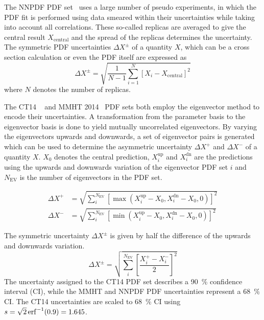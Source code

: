 The NNPDF PDF set~\cite{Ball:2014uwa} uses a large number of pseudo experiments,
in which the PDF fit is performed using data smeared within their uncertainties
while taking into account all correlations. These so-called replicas are
averaged to give the central result $X_\mathrm{central}$ and the spread of the
replicas determines the uncertainty. The symmetric PDF uncertainties $\Delta
X^\pm$ of a quantity $X$, which can be a cross section calculation or even the
PDF itself are expressed as
%
\begin{equation*}
    \Delta X^{\pm} = \sqrt{\frac{1}{N-1} \sum_{i=1}^N \left[ X_{i} - X_{\mathrm{central}} \right]^2}
\end{equation*}
%
where $N$ denotes the number of replicas.

The CT14 ~\cite{Dulat:2015mca} and MMHT 2014~\cite{Harland-Lang:2014zoa} PDF
sets both employ the eigenvector method to encode their uncertainties. A
transformation from the parameter basis to the eigenvector basis is done to
yield mutually uncorrelated eigenvectors. By varying the eigenvectors upwards
and downwards, a set of eigenvector pairs is generated which can be used to
determine the asymmetric uncertainty $\Delta X^+$ and $\Delta X^-$ of a quantity
$X$. $X_0$ denotes the central prediction, $X_i^{\mathrm{up}}$ and
$X_i^{\mathrm{dn}}$ are the predictions using the upwards and downwards
variation of the eigenvector PDF set $i$ and $N_{\mathrm{EV}}$ is the number of
eigenvectors in the PDF set.

\begin{equation*}
\begin{aligned}
    \Delta X^+ &= \sqrt{\sum_i^{N_{\mathrm{EV}}} \left[ \max(X_i^{\mathrm{up}}
    -X_0, X_i^{\mathrm{dn}} - X_0, 0)\right]^2}\\
\Delta X^- &= \sqrt{\sum_i^{N_{\mathrm{EV}}} \left[ \min(X_i^{\mathrm{up}} - X_0, X_i^{\mathrm{dn}} - X_0,0)\right]^2}
\end{aligned}
\end{equation*}

The symmetric uncertainty $\Delta X^{\pm}$ is given by half the difference of the upwards and
downwards variation.
%
\begin{equation*}
    \Delta X^{\pm} = \sqrt{\sum_i^{N_{\mathrm{EV}}} \left[ \frac{X_i^+ -
    X_i^-}{2} \right]^2}
\end{equation*}
%
The uncertainty assigned to the CT14 PDF set describes a \SI{90}{\percent} confidence
interval (CI), while the MMHT and NNPDF PDF uncertainties represent a
\SI{68}{\percent} CI.
The CT14 uncertainties are scaled to \SI{68}{\percent} CI using $s = \sqrt{2}
\operatorname{erf}^{-1}(0.9) = 1.645$.

